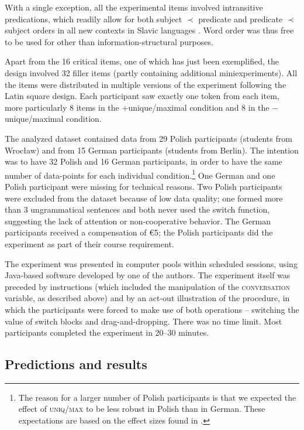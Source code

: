 \documentclass[output=paper]{langscibook}
\begin{document}
With a single exception, all the experimental items involved intransitive predications, which readily allow for both subject $\prec$ predicate and predicate $\prec$ subject orders in all new contexts in Slavic languages \citep{Junghanns2002Thetisch}. Word order was thus free to be used for other than information-structural purposes.

Apart from the 16 critical items, one of which has just been exemplified, the design involved 32 filler items (partly containing additional miniexperiments). All the items were distributed in multiple versions of the experiment following the Latin square design. Each participant saw exactly one token from each item, more particularly 8 items in the \textsf{$+$unique/maximal} condition and 8 in the \textsf{$-$unique/maximal} condition.

The analyzed dataset contained data from 29 Polish participants (students from Wrocław) and from 15 German participants (students from Berlin). The intention was to have 32 Polish and 16 German participants, in order to have the same number of data-points for each individual condition.\footnote{The reason for a larger number of Polish participants is that we expected the effect of \textsc{uniq/max} to be less robust in Polish than in German. These expectations are based on the effect sizes found in \citet{Simik.Demian2020}.\label{sim-dem:fn:effect-size}} One German and one Polish participant were missing for technical reasons. Two Polish participants were excluded from the dataset because of low data quality; one formed more than 3 ungrammatical sentences and both never used the switch function, suggesting the lack of attention or non-cooperative behavior. The German participants received a compensation of €5; the Polish participants did the experiment as part of their course requirement.

The experiment was presented in computer pools within scheduled sessions, using Java-based software developed by one of the authors. The experiment itself was preceded by instructions (which included the manipulation of the \textsc{conversation} variable, as described above) and by an act-out illustration of the procedure, in which the participants were forced to make use of both operations -- switching the value of switch blocks and drag-and-dropping. There was no time limit. Most participants completed the experiment in 20--30 minutes.

\subsection{Predictions and results}
\end{document}

